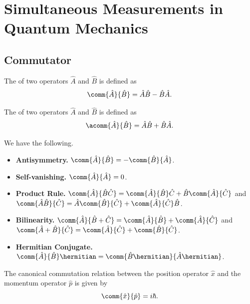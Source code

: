 \section{Simultaneous Measurements in Quantum Mechanics}

\subsection{Commutator}

\begin{definition}
    The  of two operators \(\hat{A}\) and \(\hat{B}\) is defined as
    \begin{equation}
        \comm{\hat{A}}{\hat{B}} = \hat{A}\hat{B} - \hat{B}\hat{A}.
    \end{equation}

    The  of two operators \(\hat{A}\) and \(\hat{B}\) is defined as
    \begin{equation}
        \acomm{\hat{A}}{\hat{B}} = \hat{A}\hat{B} + \hat{B}\hat{A}.
    \end{equation}
\end{definition}

\begin{proposition}
    We have the following.

    \begin{itemize}
        \item \textbf{Antisymmetry.} \(\comm{\hat{A}}{\hat{B}} = -\comm{\hat{B}}{\hat{A}}\).
        \item \textbf{Self-vanishing.} \(\comm{\hat{A}}{\hat{A}} = 0\).
        \item \textbf{Product Rule.} \(\comm{\hat{A}}{\hat{B}\hat{C}} = \comm{\hat{A}}{\hat{B}}\hat{C} + \hat{B}\comm{\hat{A}}{\hat{C}}\) and \(\comm{\hat{A}\hat{B}}{\hat{C}} = \hat{A}\comm{\hat{B}}{\hat{C}} + \comm{\hat{A}}{\hat{C}}\hat{B}\).
        \item \textbf{Bilinearity.} \(\comm{\hat{A}}{\hat{B} + \hat{C}} = \comm{\hat{A}}{\hat{B}} + \comm{\hat{A}}{\hat{C}}\) and \(\comm{\hat{A} + \hat{B}}{\hat{C}} = \comm{\hat{A}}{\hat{C}} + \comm{\hat{B}}{\hat{C}}\).
        \item \textbf{Hermitian Conjugate.} \(\comm{\hat{A}}{\hat{B}}\hermitian = \comm{\hat{B}\hermitian}{\hat{A}\hermitian}\).
    \end{itemize}
\end{proposition}

\begin{proposition}
    The canonical commutation relation between the position operator \(\hat{x}\) and the momentum operator \(\hat{p}\) is given by
    \begin{equation}
        \comm{\hat{x}}{\hat{p}} = i\hbar.
    \end{equation}
\end{proposition}

